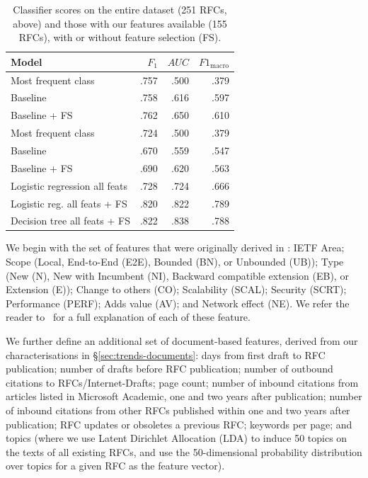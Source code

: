 \documentclass[twocolumn,10pt]{article}
\newcommand{\pb}[1]{\vspace{0.75ex}\noindent{\textbf{#1}}}
\begin{document}
\begin{table}
  \centering
  \begin{tabular}{lrrr}
    \toprule
      Model                              & $F_1$ & $\mathit{AUC}$ & $F1_{\mathrm{macro}}$ \\
    \midrule
      Most frequent class                & .757  &      .500      &     .379     \\
      Baseline                           & .758  &      .616      &     .597     \\
      Baseline + FS                      & .762  &      .650      &     .610     \\
    \midrule
      Most frequent class                & .724  &      .500      &     .379     \\
      Baseline                           & .670  &      .559      &     .547     \\
      Baseline + FS                      & .690  &      .620      &     .563     \\
      Logistic regression all feats      & .728  &      .724      &     .666     \\
      Logistic reg. all feats + FS & .820  &      .822      &     .789     \\
      Decision tree all feats + FS       & .822  &      .838      &     .788     \\
    \bottomrule
  \end{tabular}
\caption{
  Classifier scores on the entire dataset (251 RFCs, above) and those with
  our features available (155 RFCs), with or without feature selection (FS).
}
\label{tbl:mlres}
\end{table}


\pb{Classification Features:}
We begin with the set of features that were originally derived in
\cite{nikkhah2017statistical}:
IETF Area; Scope (Local, End-to-End (E2E), Bounded (BN), or Unbounded
(UB)); Type (New (N), New with Incumbent (NI), Backward compatible
extension (EB), or Extension (E)); Change to others (CO); Scalability
(SCAL); Security (SCRT); Performance (PERF); Adds value (AV); and Network
effect (NE). We refer the reader to~\cite{nikkhah2017statistical} for a
full explanation of each of these feature. 

We further define an additional set of document-based features, derived
from our characterisations in \S\ref{sec:trends-documents}: days from first
draft to RFC publication; number of drafts before RFC publication; number
of outbound citations to RFCs/Internet-Drafts; page count; number of
inbound citations from articles listed in Microsoft Academic, one and two
years after publication; number of inbound citations from other RFCs
published within one and two years after publication; RFC updates or
obsoletes a previous RFC; keywords per page; and topics (where we use
Latent Dirichlet Allocation (LDA) \cite{blei2003latent} to induce 50 topics
on the texts of all existing RFCs, and use the 50-dimensional probability
distribution over topics for a given RFC as the feature vector).
\end{document}
